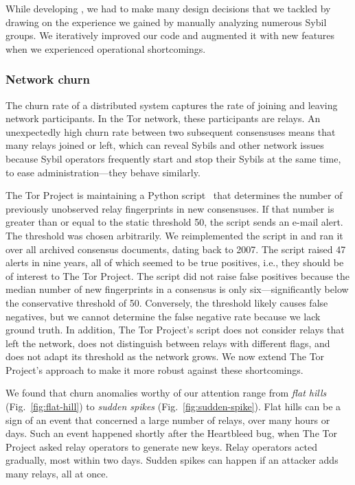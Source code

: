 While developing \sys, we had to make many design decisions that we
tackled by drawing on the experience we gained by manually analyzing numerous
Sybil groups.  We iteratively improved our code and augmented it with new
features when we experienced operational shortcomings.

\subsubsection{Network churn}
\label{sec:churn-time-series}
The churn rate of a distributed system captures the rate of joining and leaving
network participants.  In the Tor network, these participants are relays.  An
unexpectedly high churn rate between two subsequent consensuses means that many
relays joined or left, which can reveal Sybils and other network issues because
Sybil operators frequently start and stop their Sybils at the same time, to ease
administration---they behave similarly.

The Tor Project is maintaining a Python script~\cite{doctor} that determines the
number of previously unobserved relay fingerprints in new consensuses.  If that
number is greater than or equal to the static threshold 50, the script sends an
e-mail alert.  The threshold was chosen arbitrarily.  We reimplemented the script
in \sys and ran it over all archived consensus documents, dating back to 2007.
The script raised 47 alerts in nine years, all of which seemed to be true
positives, i.e., they should be of interest to The Tor Project.  The script did
not raise false positives because the median number of new fingerprints in a
consensus is only six---significantly below the conservative threshold of 50.
Conversely, the threshold likely causes false negatives, but we cannot determine
the false negative rate because we lack ground truth.  In addition, The Tor
Project's script does not consider relays that left the network, does not
distinguish between relays with different flags, and does not adapt its
threshold as the network grows.  We now extend The Tor Project's approach to
make it more robust against these shortcomings.

We found that churn anomalies worthy of our attention range from \emph{flat
hills} (Fig.~\ref{fig:flat-hill}) to \emph{sudden spikes}
(Fig.~\ref{fig:sudden-spike}).  Flat hills can be a sign of an event that
concerned a large number of relays, over many hours or days.  Such an event
happened shortly after the Heartbleed bug, when The Tor Project asked relay
operators to generate new keys.  Relay operators acted gradually, most within
two days.  Sudden spikes can happen if an attacker adds many relays, all at
once.

